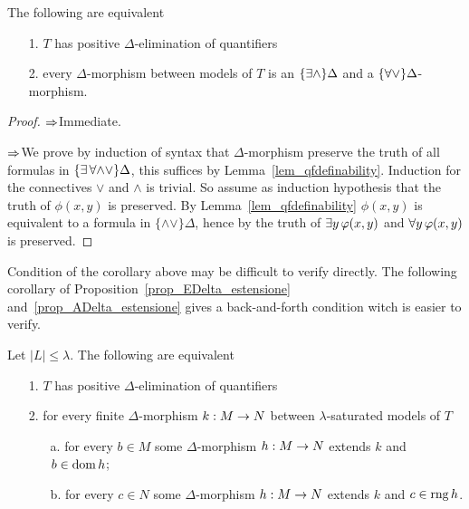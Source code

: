 \begin{corollary}\label{corol_QE}
The following are equivalent
\begin{itemize}
\item[1.] $T$ has positive $\Delta$-elimination of quantifiers
\item[2.] every $\Delta$-morphism between models of $T$ is an $\{\exists\wedge\}\Delta$ and a $\{\forall\vee\}\Delta$-morphism.
\end{itemize}
\end{corollary}
\begin{proof}
$\Rightarrow$\quad Immediate.

$\Rightarrow$\quad We prove by induction of syntax that $\Delta$-morphism preserve the truth of all formulas in $\{\exists\,\forall\mathord\wedge\mathord\vee\}\Delta$, this suffices by Lemma~\ref{lem_qfdefinability}. Induction for the connectives $\vee$ and $\wedge$ is trivial.  So assume as induction hypothesis that the truth of  $\phi(x,y)$ is preserved.  By Lemma~\ref{lem_qfdefinability} $\phi(x,y)$ is equivalent to a formula in $\{\mathord\wedge\mathord\vee\}\Delta$, hence by  the truth of $\exists y\, \varphi (x,y)$ and $\forall y \,\varphi (x,y)$ is preserved.
\end{proof}

Condition  of the corollary above may be difficult to verify directly. The following corollary of Proposition~\ref{prop_EDelta_estensione} and~\ref{prop_ADelta_estensione} gives a back-and-forth condition witch is easier to verify.

\begin{corollary}\label{corol_QE_back_and_forth}
Let $|L|\le\lambda$. The following are equivalent
\begin{itemize}
\item[1.] $T$ has positive $\Delta$-elimination of quantifiers
\item[2.] for every finite $\Delta$-morphism $k:M\rightarrow N$ between $\lambda$-saturated models of $T$
\begin{itemize}                                                                                               \item[a.] for every $b\in M$ some $\Delta$-morphism $h:M\rightarrow N$ extends $k$ and $b\in\mathop{\rm dom} h$;                                                                                \item[b.] for every $c\in N$ some $\Delta$-morphism $h:M\rightarrow N$ extends $k$ and $c\in\mathop{\rm rng} h$.\noindent\nolinebreak[4]\hfill\rlap{\ \ $\Box$}                                                                   \end{itemize}
\end{itemize}
\end{corollary}

